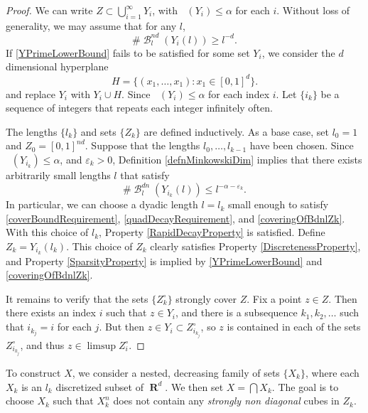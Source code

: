\documentclass[dvipsnames,letterpaper,12pt]{article}
\numberwithin{equation}{section}
\theoremstyle{plain}
\theoremstyle{remark}
\DeclareMathOperator{\lowminkdim}{\underline{\dim}_{\mathbf{M}}}
\DeclareMathOperator{\RR}{\mathbf{R}}
\DeclareMathOperator{\setcolon}{\colon}
\DeclareMathOperator{\B}{\mathcal{B}}
\begin{document}
\begin{proof}
	We can write $Z \subset \bigcup_{i = 1}^\infty Y_i$, with $\lowminkdim(Y_i) \leq \alpha$ for each $i$. Without loss of generality, we may assume that for any $l$,
	\begin{equation}\label{YPrimeLowerBound}
		\# \B^{nd}_l(Y_i(l)) \geq l^{-d}.
	\end{equation}
	If \eqref{YPrimeLowerBound} fails to be satisfied for some set $Y_i$, we consider the $d$ dimensional hyperplane
	\[ H = \{ (x_1,\dots, x_1) \setcolon x_1 \in [0,1]^d \}. \]
	and replace $Y_i$ with $Y_i \cup H$. Since $\lowminkdim(Y_i) \leq \alpha$ for each index $i$. Let $\{ i_k \}$ be a sequence of integers that repeats each integer infinitely often.

	The lengths $\{ l_k \}$ and sets $\{ Z_k \}$ are defined inductively. As a base case, set $l_0 = 1$ and $Z_0 = [0,1]^{nd}$. Suppose that the lengths $l_0, \ldots, l_{k-1}$ have been chosen. Since $\lowminkdim(Y_{i_k}) \leq \alpha$, and $\varepsilon_k > 0$, Definition \ref{defnMinkowskiDim} implies that there exists arbitrarily small lengths $l$ that satisfy
	\begin{equation} \label{coveringOfBdnlZk}
		\# \B^{dn}_l(Y_{i_k}(l)) \leq l^{-\alpha - \varepsilon_k}.
	\end{equation}
	In particular, we can choose a dyadic length $l = l_k$ small enough to satisfy \eqref{coverBoundRequirement}, \eqref{quadDecayRequirement}, and \eqref{coveringOfBdnlZk}. With this choice of $l_k$, Property \ref{RapidDecayProperty} is satisfied. Define $Z_k = Y_{i_k}(l_k)$. This choice of $Z_k$ clearly satisfies Property \ref{DiscretenessProperty}, and Property \ref{SparsityProperty} is implied by \eqref{YPrimeLowerBound} and \eqref{coveringOfBdnlZk}.

	It remains to verify that the sets $\{ Z_k^\circ \}$ strongly cover $Z$. Fix a point $z \in Z$. Then there exists an index $i$ such that $z \in Y_i$, and there is a subsequence $k_1, k_2, \dots$ such that $i_{k_j} = i$ for each $j$. But then $z \in Y_i \subset Z_{i_{k_j}}^\circ$, so $z$ is contained in each of the sets $Z_{i_{k_j}}^\circ$, and thus $z \in \limsup Z_i^\circ$.
\end{proof}

To construct $X$, we consider a nested, decreasing family of sets $\{ X_k \}$, where each $X_k$ is an $l_k$ discretized subset of $\RR^d$. We then set $X = \bigcap X_k$. The goal is to choose $X_k$ such that $X_k^n$ does not contain any {\it strongly non diagonal} cubes in $Z_k$.
\end{document}
